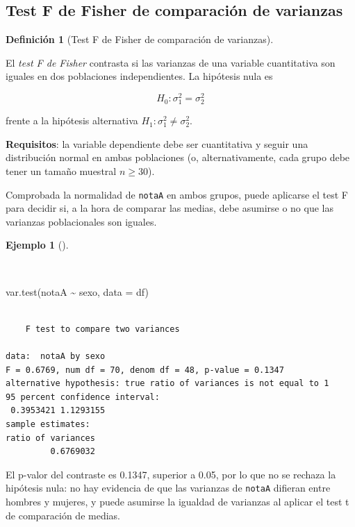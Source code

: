 \documentclass[
  spanish,
  a4paper,
]{scrreport}
\newenvironment{Shaded}{\begin{snugshade}}{\end{snugshade}}
\newcommand{\AttributeTok}[1]{\textcolor[rgb]{0.40,0.45,0.13}{#1}}
\newcommand{\FunctionTok}[1]{\textcolor[rgb]{0.28,0.35,0.67}{#1}}
\newcommand{\NormalTok}[1]{\textcolor[rgb]{0.00,0.23,0.31}{#1}}
\newcommand{\SpecialCharTok}[1]{\textcolor[rgb]{0.37,0.37,0.37}{#1}}
\theoremstyle{definition}
\newtheorem{example}{Ejemplo}[chapter]
\theoremstyle{definition}
\newtheorem{definition}{Definición}[chapter]
\theoremstyle{remark}
\begin{document}
\subsection{Test F de Fisher de comparación de
varianzas}\label{test-f-de-fisher-de-comparaciuxf3n-de-varianzas}

\begin{definition}[Test F de Fisher de comparación de
varianzas]\protect\hypertarget{def-dosindep-test-f}{}\label{def-dosindep-test-f}

El \emph{test F de Fisher} contrasta si las varianzas de una variable
cuantitativa son iguales en dos poblaciones independientes. La hipótesis
nula es

\[H_0: \sigma_1^2 = \sigma_2^2\]

frente a la hipótesis alternativa \(H_1: \sigma_1^2 \neq \sigma_2^2\).

\end{definition}

\textbf{Requisitos}: la variable dependiente debe ser cuantitativa y
seguir una distribución normal en ambas poblaciones (o,
alternativamente, cada grupo debe tener un tamaño muestral
\(n \geq 30\)).

Comprobada la normalidad de \texttt{notaA} en ambos grupos, puede
aplicarse el test F para decidir si, a la hora de comparar las medias,
debe asumirse o no que las varianzas poblacionales son iguales.

\begin{example}[]\protect\hypertarget{exm-dosindep-test-f}{}\label{exm-dosindep-test-f}

~

\begin{Shaded}
\begin{Highlighting}[]
\FunctionTok{var.test}\NormalTok{(notaA }\SpecialCharTok{\textasciitilde{}}\NormalTok{ sexo, }\AttributeTok{data =}\NormalTok{ df)}
\end{Highlighting}
\end{Shaded}

\begin{verbatim}

    F test to compare two variances

data:  notaA by sexo
F = 0.6769, num df = 70, denom df = 48, p-value = 0.1347
alternative hypothesis: true ratio of variances is not equal to 1
95 percent confidence interval:
 0.3953421 1.1293155
sample estimates:
ratio of variances 
         0.6769032 
\end{verbatim}

El p-valor del contraste es 0.1347, superior a 0.05, por lo que no se
rechaza la hipótesis nula: no hay evidencia de que las varianzas de
\texttt{notaA} difieran entre hombres y mujeres, y puede asumirse la
igualdad de varianzas al aplicar el test t de comparación de medias.

\end{example}
\end{document}
